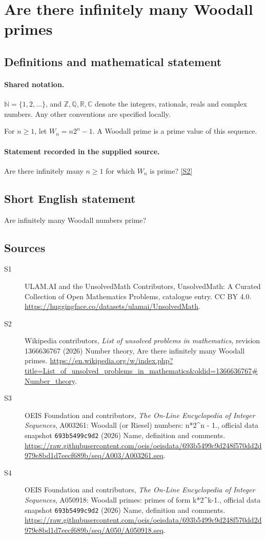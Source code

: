 \documentclass[11pt]{article}
\newcommand{\sref}[2]{\hyperlink{source:#1:#2}{[S#2]}}
\begin{document}
\section{Are there infinitely many Woodall primes}\label{statement}

\subsection{Definitions and mathematical statement}

\paragraph{Shared notation.}$\mathbb N=\{1,2,\ldots\}$, and $\mathbb Z,\mathbb Q,\mathbb R,\mathbb C$ denote the integers, rationals, reals and complex numbers. Any other conventions are specified locally.


For $n\ge1$, let $W_n=n2^n-1$. A Woodall prime is a prime value of this sequence.
\paragraph{Statement recorded in the supplied source.}
Are there infinitely many $n\ge1$ for which $W_n$ is prime? \sref{statement}{2}
\subsection{Short English statement}
Are infinitely many Woodall numbers prime?
\subsection{Sources}
\begin{description}
\item[\hypertarget{source:statement:1}{S1}] ULAM.AI and the UnsolvedMath Contributors, UnsolvedMath: A Curated Collection of Open Mathematics Problems, catalogue entry. CC BY 4.0. \url{https://huggingface.co/datasets/ulamai/UnsolvedMath}.
\item[\hypertarget{source:statement:2}{S2}] Wikipedia contributors, \emph{List of unsolved problems in mathematics}, revision 1366636767 (2026) Number theory, Are there infinitely many Woodall primes. \url{https://en.wikipedia.org/w/index.php?title=List_of_unsolved_problems_in_mathematics&oldid=1366636767#Number_theory}.
\item[\hypertarget{source:statement:3}{S3}] OEIS Foundation and contributors, \emph{The On-Line Encyclopedia of Integer Sequences}, A003261: Woodall (or Riesel) numbers: n*2\textasciicircum{}n - 1., official data snapshot \texttt{693b5499c9d2} (2026) Name, definition and comments. \url{https://raw.githubusercontent.com/oeis/oeisdata/693b5499c9d248f570dd2d979e8bd1d7eecf689b/seq/A003/A003261.seq}.
\item[\hypertarget{source:statement:4}{S4}] OEIS Foundation and contributors, \emph{The On-Line Encyclopedia of Integer Sequences}, A050918: Woodall primes: primes of form k*2\textasciicircum{}k-1., official data snapshot \texttt{693b5499c9d2} (2026) Name, definition and comments. \url{https://raw.githubusercontent.com/oeis/oeisdata/693b5499c9d248f570dd2d979e8bd1d7eecf689b/seq/A050/A050918.seq}.
\end{description}
\label{end:statement}
\end{document}
